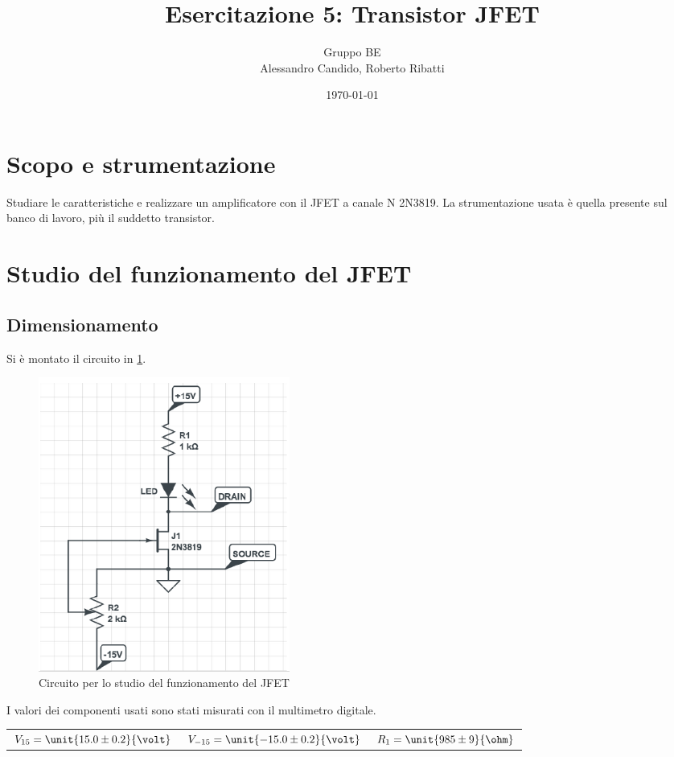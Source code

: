 \documentclass[10pt,a4paper]{article}
\title{Esercitazione 5: Transistor JFET}
\author{Gruppo BE \\ Alessandro Candido, Roberto Ribatti}
\date{\today}
\begin{document}
\maketitle

\section{Scopo e strumentazione}
Studiare le caratteristiche e realizzare un amplificatore con il JFET a canale N 2N3819.
La strumentazione usata è quella presente sul banco di lavoro, più il suddetto transistor.

\section{Studio del funzionamento del JFET}

\subsection{Dimensionamento}
Si è montato il circuito in \figurename{\ref{fig:circuito1}}.

\begin{figure}[h!]
	\centering
	\includegraphics[width=0.4\textwidth]{../grafici/Circuito1.png}
	\caption{Circuito per lo studio del funzionamento del JFET}
	\label{fig:circuito1}
\end{figure}

I valori dei componenti usati sono stati misurati con il multimetro digitale.

\begin{table}[h!]
	\centering
	\begin{tabular}{ccc}
		$V_{15} = \unit{15.0 \pm 0.2}{\volt}$  & $V_{-15} = \unit{-15.0 \pm 0.2}{\volt}$ & $R_1 = \unit{985 \pm 9}{\ohm}$
	\end{tabular}
\end{table}
\end{document}
